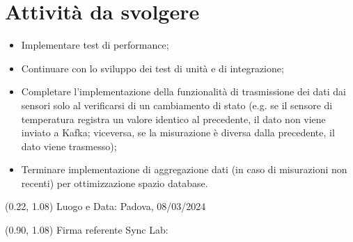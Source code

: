 \documentclass{article}
\begin{document}
\section{Attività da svolgere}
    \begin{itemize}
        \item Implementare test di performance;
        \item Continuare con lo sviluppo dei test di unità e di integrazione;
        \item Completare l'implementazione della funzionalità di trasmissione dei dati dai sensori solo al verificarsi di un cambiamento di stato (e.g. se il sensore di temperatura registra un valore identico al precedente, il dato non viene inviato a Kafka; viceversa, se la misurazione è diversa dalla precedente, il dato viene trasmesso);
        \item Terminare implementazione di aggregazione dati (in caso di misurazioni non recenti) per ottimizzazione spazio database.
\end{itemize}
\begin{textblock*}{\textwidth}(0.22\textwidth, 1.08\textheight)
    Luogo e Data: Padova, 08/03/2024
\end{textblock*}

\begin{textblock*}{\textwidth}(0.90\textwidth, 1.08\textheight)
        Firma referente Sync Lab:
\end{textblock*}
\end{document}
